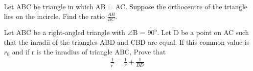 \item Let ABC be triangle in which AB = AC. Suppose the orthocentre of the triangle lies on the incircle. Find the ratio $\frac{AB}{BC}$.

\item Let ABC be a right-angled triangle with $\angle$B = $90^{o}$. Let D be a point on AC such that the inradii of the triangles ABD and CBD are equal. If this common value is $r_0$ and if r is the inradius of triangle ABC, Prove that
\begin{align*}
\frac{1}{r^{'}} = \frac{1}{r} + \frac{1}{BD} 
\end{align*}
























